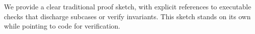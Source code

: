 We provide a clear traditional proof sketch, with explicit references to executable checks that discharge subcases or verify invariants. This sketch stands on its own while pointing to code for verification.

